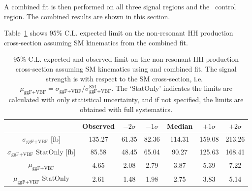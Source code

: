\label{sec:DiHiggs:combination-bbtautau}
A combined fit is then performed on all three signal regions and the \ZHF\ control region.
The combined results are shown in this section. 



Table~\ref{sec:fit:tab:SMCombinedLimits} shows 95\% C.L. expected limit on the non-resonant
HH production cross-section assuming SM kinematics from the combined fit.


\begin{table}[htbp]
\centering
\begin{tabular}{|c|c|c|c|c|c|c|}
\hline
& Observed & $-2\sigma$ & $-1\sigma$ & Median & $+1\sigma$ & $+2\sigma$\\
\hline
$\sigma_\text{ggF+VBF}$ [fb] & 135.27   & 61.35  &   82.36  &   114.31   &   159.08  &   213.26 \\ 
\hline
$\sigma_\text{ggF+VBF}$ StatOnly [fb] & 85.58  &    48.45  &   65.04  &  90.27  &   125.63  &   168.41 \\ 
\hline
$\mu_\text{ggF+VBF}$ & 4.65  &     2.08   &    2.79   &    3.87  &    5.39  &    7.22 \\ 
\hline
$\mu_\text{ggF+VBF}$ StatOnly & 2.61   &    1.48   &    1.98   &    2.75   &    3.83  &    5.14 \\ 
\hline
\end{tabular}
\caption{95\% C.L. expected and observed limit on the non-resonant HH production cross-section 
assuming SM kinematics using \lephad and \hadhad combined fit.
The signal strength is with respect to the 
SM cross-section, i.e.\ 
$\mu_\text{ggF+VBF}=\sigma_\text{ggF+VBF}/\sigma_\text{ggF+VBF}^\text{SM}$.
The `StatOnly' indicates the limits are calculated with only statistical uncertainty,
and if not specified, the limits are obtained with full systematics.}
\label{sec:fit:tab:SMCombinedLimits}
\end{table}

